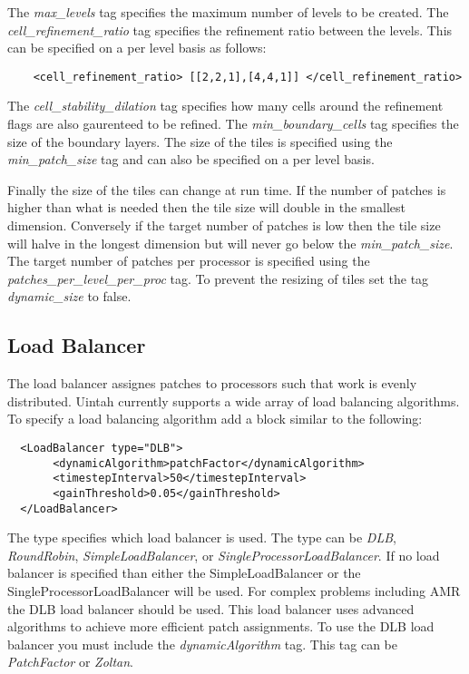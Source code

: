The \emph{max\_levels} tag specifies the maximum number of levels
to be created.  The \emph{cell\_refinement\_ratio} tag specifies the 
refinement ratio between the levels.  This can be specified on a per 
level basis as follows:

\begin{Verbatim}
    <cell_refinement_ratio> [[2,2,1],[4,4,1]] </cell_refinement_ratio>
\end{Verbatim}

The \emph{cell\_stability\_dilation} tag specifies how many cells around
the refinement flags are also gaurenteed to be refined.  The
\emph{min\_boundary\_cells} tag specifies the size of the boundary layers. 
The size of the tiles is specified using the \emph{min\_patch\_size} tag
and can also be specified on a per level basis.

Finally the size of the tiles can change at run time.  If the number
of patches is higher than what is needed then the tile size will double in
the smallest dimension.  Conversely if the target number of patches is low
then the tile size will halve in the longest dimension but will never go
below the \emph{min\_patch\_size}.  The target number of patches per processor is 
specified using the \emph{patches\_per\_level\_per\_proc} tag. To prevent the 
resizing of tiles set the tag \emph{dynamic\_size} to false. 

%
\subsection{Load Balancer}

The load balancer assignes patches to processors such that work is 
evenly distributed.  Uintah currently supports a wide array of 
load balancing algorithms.  To specify a load balancing algorithm 
add a block similar to the following:

\begin{Verbatim}
  <LoadBalancer type="DLB">
       <dynamicAlgorithm>patchFactor</dynamicAlgorithm>
       <timestepInterval>50</timestepInterval>
       <gainThreshold>0.05</gainThreshold>
  </LoadBalancer>
\end{Verbatim}

The type specifies which load balancer is used.  The type can be \emph{DLB}, 
\emph{RoundRobin}, \emph{SimpleLoadBalancer}, or \emph{SingleProcessorLoadBalancer}.  
If no load balancer is specified than either the SimpleLoadBalancer 
or the SingleProcessorLoadBalancer will be used.  For complex problems including 
AMR the DLB load  balancer should be used.  This load balancer uses advanced 
algorithms to achieve more efficient patch assignments.  To use the DLB load 
balancer you must include the  \emph{dynamicAlgorithm} tag. This tag can be 
\emph{PatchFactor} or \emph{Zoltan}.  

